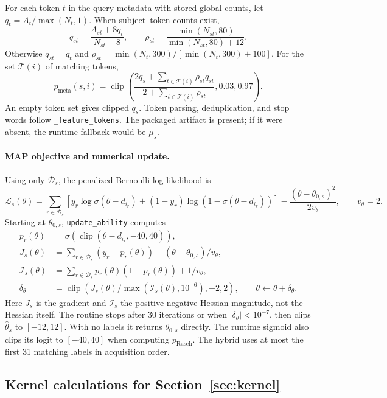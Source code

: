 \documentclass{article}
\begin{document}
For each token $t$ in the query metadata with stored global counts, let $q_t=A_t/\max(N_t,1)$. When subject--token counts exist,
\[
 q_{st}=\frac{A_{st}+8q_t}{N_{st}+8},\qquad
 \rho_{st}=\frac{\min(N_{st},80)}{\min(N_{st},80)+12}.
\]
Otherwise $q_{st}=q_t$ and $\rho_{st}=\min(N_t,300)/[\min(N_t,300)+100]$. For the set $\mathcal T(i)$ of matching tokens,
\[
 p_{\mathrm{meta}}(s,i)=\operatorname{clip}\!\left(
 \frac{2q_s+\sum_{t\in\mathcal T(i)}\rho_{st}q_{st}}
      {2+\sum_{t\in\mathcal T(i)}\rho_{st}},0.03,0.97\right).
\]
An empty token set gives clipped $q_s$. Token parsing, deduplication, and stop words follow \texttt{\_feature\_tokens}. The packaged artifact is present; if it were absent, the runtime fallback would be $\mu_s$.

\paragraph{MAP objective and numerical update.}
Using only $\mathcal D_s$, the penalized Bernoulli log-likelihood is
\[
 \mathcal L_s(\theta)=\sum_{r\in\mathcal D_s}
 \left[y_r\log\sigma(\theta-d_{i_r})+(1-y_r)\log(1-\sigma(\theta-d_{i_r}))\right]
 -\frac{(\theta-\theta_{0,s})^2}{2v_\theta},\qquad v_\theta=2.
\]
Starting at $\theta_{0,s}$, \texttt{update\_ability} computes
\[
 \begin{aligned}
 p_r(\theta)&=\sigma(\operatorname{clip}(\theta-d_{i_r},-40,40)),\\
 J_s(\theta)&=\sum_{r\in\mathcal D_s}(y_r-p_r(\theta))-(\theta-\theta_{0,s})/v_\theta,\\
 \mathcal I_s(\theta)&=\sum_{r\in\mathcal D_s}p_r(\theta)(1-p_r(\theta))+1/v_\theta,\\
 \delta_\theta&=\operatorname{clip}\!\left(J_s(\theta)/\max(\mathcal I_s(\theta),10^{-6}),-2,2\right),\qquad
 \theta\leftarrow\theta+\delta_\theta.
 \end{aligned}
\]
Here $J_s$ is the gradient and $\mathcal I_s$ the positive negative-Hessian magnitude, not the Hessian itself. The routine stops after 30 iterations or when $|\delta_\theta|<10^{-7}$, then clips $\hat\theta_s$ to $[-12,12]$. With no labels it returns $\theta_{0,s}$ directly. The runtime sigmoid also clips its logit to $[-40,40]$ when computing $p_{\mathrm{Rasch}}$. The hybrid uses at most the first 31 matching labels in acquisition order.

\subsection{Kernel calculations for Section~\ref{sec:kernel}}\label{app:kernel}
\end{document}
